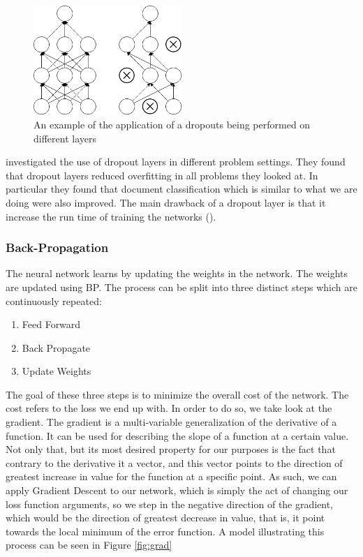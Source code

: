 \begin{description}
        \begin{figure}
        \centering
        \includegraphics[width=0.5\textwidth]{./pictures/method/Dropout.png}
        \caption{An example of the application of a dropouts being performed
            on different layers}
        \label{fig:dropout}
        \end{figure}

        \cite{JMLR:v15:srivastava14a} investigated the use of dropout layers
        in different problem settings. They found that dropout layers reduced
        overfitting in all problems they looked at. In particular they found
        that document classification which is similar to what we are doing were
        also improved. The main drawback of a dropout layer is that it increase
        the run time of training the networks (\cite{JMLR:v15:srivastava14a}).

\end{description}


\subsubsection{Back-Propagation}\label{sec:BP}

The neural network learns by updating the weights in the network. The weights
are updated using \gls{BP}. The process can be split into three distinct steps
which are continuously repeated:

\begin{enumerate}
    \item Feed Forward
    \item Back Propagate
    \item Update Weights
\end{enumerate}

The goal of these three steps is to minimize the overall cost of the network.
The cost refers to the loss we end up with. In order to do so, we take look at
the gradient. The gradient is a multi-variable generalization of the derivative
of a function. It can be used for describing the slope of a function at a
certain value. Not only that, but its most desired property for our purposes is
the fact that contrary to the derivative it a vector, and this vector points
to the direction of greatest increase in value for the function at a specific
point. As such, we can apply Gradient Descent to our network, which is simply
the act of changing our loss function arguments, so we step in the negative
direction of the gradient, which would be the direction of greatest decrease
in value, that is, it point towards the local minimum of the error function. A
model illustrating this process can be seen in Figure \ref{fig:grad}

